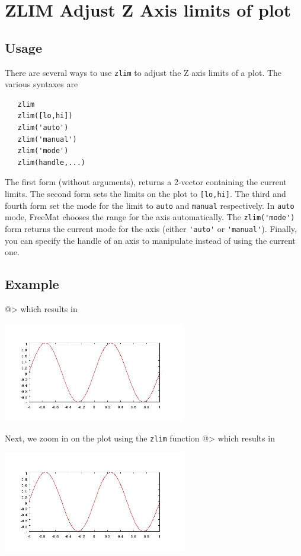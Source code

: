 \section{ZLIM Adjust Z Axis limits of plot}

\subsection{Usage}

There are several ways to use \verb|zlim| to adjust the Z axis limits of
a plot.  The various syntaxes are
\begin{verbatim}
   zlim
   zlim([lo,hi])   
   zlim('auto')
   zlim('manual')
   zlim('mode')
   zlim(handle,...)
\end{verbatim}
The first form (without arguments), returns a 2-vector containing the
current limits.  The second form sets the limits on the plot to \verb|[lo,hi]|.
The third and fourth form set the mode for the limit to \verb|auto| and \verb|manual|
respectively.  In \verb|auto| mode, FreeMat chooses the range for the axis 
automatically.  The \verb|zlim('mode')| form returns the current mode for the axis
(either \verb|'auto'| or \verb|'manual'|).  Finally, you can specify the handle of an
axis to manipulate instead of using the current one.
\subsection{Example}

@>
which results in


\centerline{\includegraphics[width=8cm]{zlim1}}

Next, we zoom in on the plot using the \verb|zlim| function
@>
which results in


\centerline{\includegraphics[width=8cm]{zlim2}}

